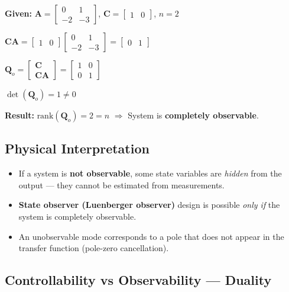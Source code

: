 \documentclass[12pt,a4paper]{article}
\begin{document}
\begin{tcolorbox}[examplebox, title={Example: Check Observability}]
\textbf{Given:} $\mathbf{A}=\begin{bmatrix}0&1\\-2&-3\end{bmatrix}$, $\mathbf{C}=\begin{bmatrix}1&0\end{bmatrix}$, $n=2$

$\mathbf{C}\mathbf{A} = \begin{bmatrix}1&0\end{bmatrix}\begin{bmatrix}0&1\\-2&-3\end{bmatrix} = \begin{bmatrix}0&1\end{bmatrix}$

$\mathbf{Q}_o = \begin{bmatrix}\mathbf{C}\\\mathbf{C}\mathbf{A}\end{bmatrix} = \begin{bmatrix}1&0\\0&1\end{bmatrix}$

$\det(\mathbf{Q}_o) = 1 \neq 0$

\textbf{Result:} $\text{rank}(\mathbf{Q}_o) = 2 = n$ $\Rightarrow$ System is \textbf{completely observable}.
\end{tcolorbox}

\subsection{Physical Interpretation}

\begin{itemize}[leftmargin=*, itemsep=3pt]
  \item If a system is \textbf{not observable}, some state variables are \textit{hidden} from the output --- they cannot be estimated from measurements.
  \item \textbf{State observer (Luenberger observer)} design is possible \textit{only if} the system is completely observable.
  \item An unobservable mode corresponds to a pole that does not appear in the transfer function (pole-zero cancellation).
\end{itemize}

\subsection{Controllability vs Observability --- Duality}
\end{document}
